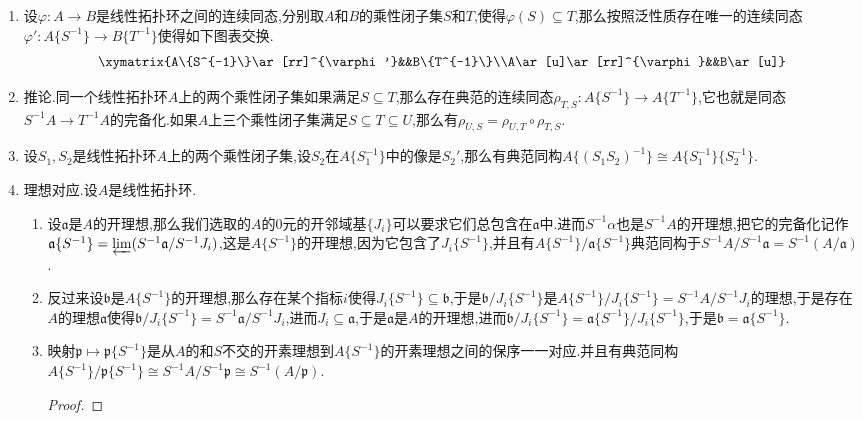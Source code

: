 \begin{enumerate}
\begin{proof}
    	只需说明$S^{-1}A$中0不落在$\{1\}$的闭包中(从而$0\not=1$),而这是因为如果0在$\{1\}$闭包中,就有1落在每个$S^{-1}J_i$中,进而$J_i\cap S$总非空,进而在$A$中0落在$S$的闭包中.
    \end{proof}
    \item 设$\varphi:A\to B$是线性拓扑环之间的连续同态,分别取$A$和$B$的乘性闭子集$S$和$T$,使得$\varphi(S)\subseteq T$,那么按照泛性质存在唯一的连续同态$\varphi':A\{S^{-1}\}\to B\{T^{-1}\}$使得如下图表交换.
    $$\xymatrix{A\{S^{-1}\}\ar[rr]^{\varphi'}&&B\{T^{-1}\}\\A\ar[u]\ar[rr]^{\varphi}&&B\ar[u]}$$
    \item 推论.同一个线性拓扑环$A$上的两个乘性闭子集如果满足$S\subseteq T$,那么存在典范的连续同态$\rho_{T,S}:A\{S^{-1}\}\to A\{T^{-1}\}$,它也就是同态$S^{-1}A\to T^{-1}A$的完备化.如果$A$上三个乘性闭子集满足$S\subseteq T\subseteq U$,那么有$\rho_{U,S}=\rho_{U,T}\circ\rho_{T,S}$.
    \item 设$S_1,S_2$是线性拓扑环$A$上的两个乘性闭子集,设$S_2$在$A\{S_1^{-1}\}$中的像是$S_2'$,那么有典范同构$A\{(S_1S_2)^{-1}\}\cong A\{S_1^{-1}\}\{S_2^{-1}\}$.
    \item 理想对应.设$A$是线性拓扑环.
    \begin{enumerate}[(1)] 	
    	\item 设$\mathfrak{a}$是$A$的开理想,那么我们选取的$A$的0元的开邻域基$\{J_i\}$可以要求它们总包含在$\mathfrak{a}$中.进而$S^{-1}\alpha$也是$S^{-1}A$的开理想,把它的完备化记作$\mathfrak{a}\{S^{-1}\}=\varprojlim(S^{-1}\mathfrak{a}/S^{-1}J_i)$,这是$A\{S^{-1}\}$的开理想,因为它包含了$J_i\{S^{-1}\}$,并且有$A\{S^{-1}\}/\mathfrak{a}\{S^{-1}\}$典范同构于$S^{-1}A/S^{-1}\mathfrak{a}=S^{-1}(A/\mathfrak{a})$.
    	\item 反过来设$\mathfrak{b}$是$A\{S^{-1}\}$的开理想,那么存在某个指标$i$使得$J_i\{S^{-1}\}\subseteq\mathfrak{b}$,于是$\mathfrak{b}/J_i\{S^{-1}\}$是$A\{S^{-1}\}/J_i\{S^{-1}\}=S^{-1}A/S^{-1}J_i$的理想,于是存在$A$的理想$\mathfrak{a}$使得$\mathfrak{b}/J_i\{S^{-1}\}=S^{-1}\mathfrak{a}/S^{-1}J_i$,进而$J_i\subseteq\mathfrak{a}$,于是$\mathfrak{a}$是$A$的开理想,进而$\mathfrak{b}/J_i\{S^{-1}\}=\mathfrak{a}\{S^{-1}\}/J_i\{S^{-1}\}$,于是$\mathfrak{b}=\mathfrak{a}\{S^{-1}\}$.
    	\item 映射$\mathfrak{p}\mapsto\mathfrak{p}\{S^{-1}\}$是从$A$的和$S$不交的开素理想到$A\{S^{-1}\}$的开素理想之间的保序一一对应.并且有典范同构$A\{S^{-1}\}/\mathfrak{p}\{S^{-1}\}\cong S^{-1}A/S^{-1}\mathfrak{p}\cong S^{-1}(A/\mathfrak{p})$.
    	\begin{proof}
    		

\end{proof}
\end{enumerate}
\end{enumerate}
